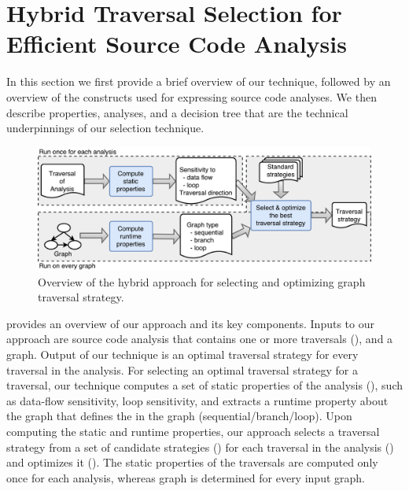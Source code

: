 \chapter{Hybrid Traversal Selection for Efficient Source Code Analysis}
\label{sec:approach}
\label{sec:overview}
 
In this section we first provide a brief overview of our technique, 
followed by an overview of the constructs used for expressing source code analyses.
We then describe properties, analyses, and a decision tree that are 
the technical underpinnings of our selection technique.

\begin{figure}[ht!]
  \centering \includegraphics[width=0.9\linewidth]{figures/hybrid-overview.pdf}
\caption{Overview of the hybrid approach for selecting and optimizing graph traversal strategy.}
  \label{fig:overview}
\end{figure}

 provides an overview of our approach and its key components.
Inputs to our approach are source code analysis that contains one or more 
traversals (), and a graph. 
Output of our technique is an optimal traversal strategy for every
traversal in the analysis. For selecting an optimal traversal strategy for a
traversal, our technique computes a set of static properties of 
the analysis (),
such as data-flow sensitivity, loop sensitivity, and extracts a runtime property
about the graph that defines the \graphprop{} in the graph
(sequential/branch/loop). Upon computing the static and runtime properties, our
approach selects a traversal strategy from a set of candidate strategies () for
each traversal in the analysis () and 
optimizes it (). The static properties of the
traversals are computed only once for each analysis, whereas graph \graphprop{} 
is determined for every input graph.



